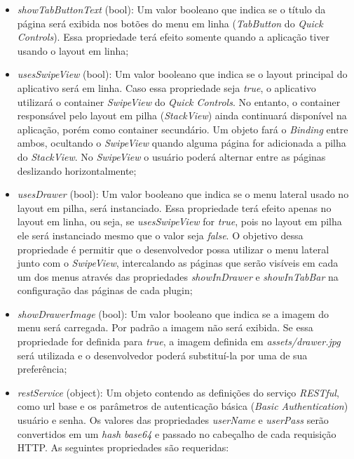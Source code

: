 \begin{itemize}
	\item \textit{showTabButtonText} (bool): Um valor booleano que indica se o título da página será exibida nos botões do menu em linha (\textit{TabButton} do \textit{Quick Controls}). Essa propriedade terá efeito somente quando a aplicação tiver usando o layout em linha;

	\item \textit{usesSwipeView} (bool): Um valor booleano que indica se o layout principal do aplicativo será em linha. Caso essa propriedade seja \textit{true}, o aplicativo utilizará o container \textit{SwipeView} do \textit{Quick Controls}. No entanto, o container responsável pelo layout em pilha (\textit{StackView}) ainda continuará disponível na aplicação, porém como container secundário. Um objeto fará o \textit{Binding} entre ambos, ocultando o \textit{SwipeView} quando alguma página for adicionada a pilha do \textit{StackView}. No \textit{SwipeView} o usuário poderá alternar entre as páginas deslizando horizontalmente;

	\item \textit{usesDrawer} (bool): Um valor booleano que indica se o menu lateral usado no layout em pilha, será instanciado. Essa propriedade terá efeito apenas no layout em linha, ou seja, se \textit{usesSwipeView} for \textit{true}, pois no layout em pilha ele será instanciado mesmo que o valor seja \textit{false}. O objetivo dessa propriedade é permitir que o desenvolvedor possa utilizar o menu lateral junto com o \textit{SwipeView}, intercalando as páginas que serão visíveis em cada um dos menus através das propriedades \textit{showInDrawer} e \textit{showInTabBar} na configuração das páginas de cada plugin;

	\item \textit{showDrawerImage} (bool): Um valor booleano que indica se a imagem do menu será carregada. Por padrão a imagem não será exibida. Se essa propriedade for definida para \textit{true}, a imagem definida em \textit{assets/drawer.jpg} será utilizada e o desenvolvedor poderá substituí-la por uma de sua preferência;

	\item \textit{restService} (object): Um objeto contendo as definições do serviço \textit{RESTful}, como url base e os parâmetros de autenticação básica (\textit{Basic Authentication}) usuário e senha. Os valores das propriedades \textit{userName} e \textit{userPass} serão convertidos em um \textit{hash} \textit{base64} e passado no cabeçalho de cada requisição HTTP. As seguintes propriedades são requeridas:


\end{itemize}
